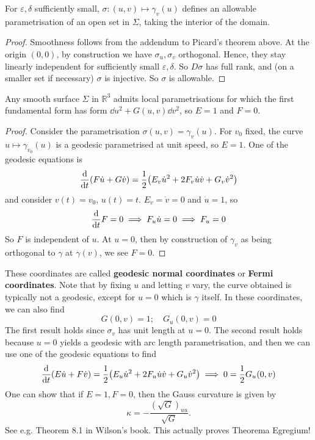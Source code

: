 \documentclass[a4paper]{article}
\begin{document}
\begin{lemma}
	For \( \varepsilon, \delta \) sufficiently small, \( \sigma \colon (u,v) \mapsto \gamma_v(u) \) defines an allowable parametrisation of an open set in \( \Sigma \), taking the interior of the domain.
\end{lemma}
\begin{proof}
	Smoothness follows from the addendum to Picard's theorem above.
	At the origin \( (0,0) \), by construction we have \( \sigma_u, \sigma_v \) orthogonal.
	Hence, they stay linearly independent for sufficiently small \( \varepsilon, \delta \).
	So \( D\sigma \) has full rank, and (on a smaller set if necessary) \( \sigma \) is injective.
	So \( \sigma \) is allowable.
\end{proof}
\begin{proposition}
	Any smooth surface \( \Sigma \) in \( \mathbb R^3 \) admits local parametrisations for which the first fundamental form has form \( \dd{u}^2 + G(u,v) \dd{v}^2 \), so \( E = 1 \) and \( F = 0 \).
\end{proposition}
\begin{proof}
	Consider the parametrisation \( \sigma(u,v) = \gamma_v(u) \).
	For \( v_0 \) fixed, the curve \( u \mapsto \gamma_{v_0}(u) \) is a geodesic parametrised at unit speed, so \( E = 1 \).
	One of the geodesic equations is
	\[
		\dv{t} \qty(F \dot u + G \dot v) = \frac{1}{2} \qty(E_v \dot u^2 + 2F_v \dot u \dot v + G_v \dot v^2)
	\]
	and consider \( v(t) = v_0 \), \( u(t) = t \).
	\( E_v = \dot v = 0 \) and \( \dot u = 1 \), so
	\[
		\dv{t} F = 0 \implies F_u \dot u = 0 \implies F_u = 0
	\]
	So \( F \) is independent of \( u \).
	At \( u = 0 \), then by construction of \( \gamma_v \) as being orthogonal to \( \gamma \) at \( \gamma(v) \), we see \( F = 0 \).
\end{proof}
These coordinates are called \textbf{geodesic normal coordinates} or \textbf{Fermi coordinates}.
Note that by fixing \( u \) and letting \( v \) vary, the curve obtained is typically not a geodesic, except for \( u = 0 \) which is \( \gamma \) itself.
In these coordinates, we can also find
\[
	G(0,v) = 1;\quad G_u(0,v) = 0
\]
The first result holds since \( \sigma_v \) has unit length at \( u = 0 \).
The second result holds because \( u = 0 \) yields a geodesic with arc length parametrisation, and then we can use one of the geodesic equations to find
\[
	\dv{t} \qty(E \dot u + F \dot v) = \frac{1}{2}\qty(E_u \dot u^2 + 2F_u \dot u \dot v + G_u \dot v^2) \implies 0 = \frac{1}{2} G_u(0,v)
\]
One can show that if $E=1,F=0$, then the Gauss curvature is given by 
\[
	\kappa = -\frac{(\sqrt{G})_{uu}}{\sqrt{G}}. 
\]
See e.g. Theorem 8.1 in Wilson's book. This actually proves Theorema Egregium!
\end{document}
